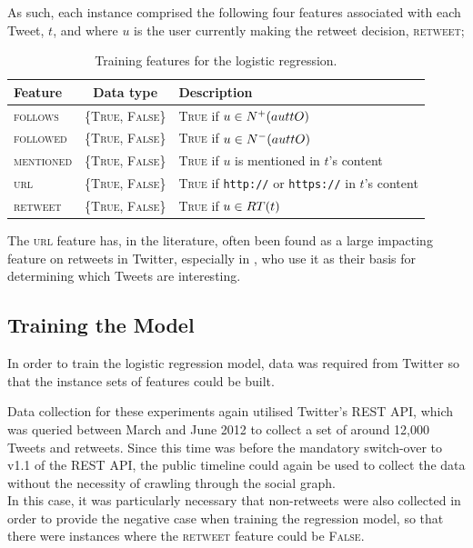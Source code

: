 As such, each instance comprised the following four features associated with each Tweet, $t$, and where $u$ is the user currently making the retweet decision, \textsc{retweet};

\begin{table}[h]\footnotesize
\begin{center}
\begin{tabular}{ l | c | l }
	Feature & Data type & Description\\
	\hline
	\hline 
	\textsc{follows}    & \{\textsc{True, False}\} & \textsc{True} if $u \in N^+(aut{t}{O})$\\
    \textsc{followed}   & \{\textsc{True, False}\} & \textsc{True} if $u \in N^-(aut{t}{O})$\\
    \textsc{mentioned}  & \{\textsc{True, False}\} & \textsc{True} if $u$ is mentioned in $t$'s content\\
    \textsc{url}        & \{\textsc{True, False}\} & \textsc{True} if \texttt{http://} or \texttt{https://} in $t$'s content\\
    \hline 
    \textsc{retweet}    & \{\textsc{True, False}\} & \textsc{True} if $u \in RT(t)$\\ 
    \hline
\end{tabular}
\end{center}
\caption{Training features for the logistic regression.}
\label{table:logisticregressionfeatures}
\end{table}

The \textsc{url} feature has, in the literature, often been found as a large impacting feature on retweets in Twitter, especially in \cite{alonso10}, who use it as their basis for determining which Tweets are interesting.


\subsection{Training the Model}
In order to train the logistic regression model, data was required from Twitter so that the instance sets of features could be built. 

Data collection for these experiments again utilised Twitter's REST API, which was queried between March and June 2012 to collect a set of around 12,000 Tweets and retweets. Since this time was before the mandatory switch-over to v1.1 of the REST API, the public timeline could again be used to collect the data without the necessity of crawling through the social graph.\\
In this case, it was particularly necessary that non-retweets were also collected in order to provide the negative case when training the regression model, so that there were instances where the \textsc{retweet} feature could be \textsc{False}.

